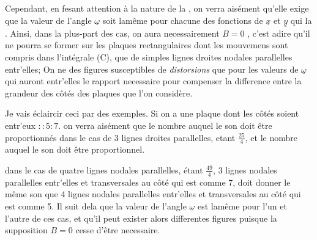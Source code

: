 \documentclass[11pt,a4paper]{article}
\begin{document}
Cependant, en fesant attention à la nature de la  ,
on verra aisément qu'elle exige que la valeur de l'angle $\underline{\omega}$
soit lamême pour chacune des fonctions de $\underline{x}$ et $\underline{y}$ qui la
 . Ainsi,  dans la plus-part des cas, on aura necessairement
$B=0$ , c'est adire qu'il ne pourra se former  sur les plaques rectangulaires dont les mouvemens sont
compris dans l'intégrale (C), que de simples lignes droites
nodales parallelles entr'elles;  On ne  
des  figures susceptibles de \emph{distorsions} que pour les
valeurs de  $\underline{\omega}$ qui  auront entr'elles le rapport
necessaire pour compenser la difference entre la grandeur
des côtés des plaques  que l'on considère.

Je vais éclaircir ceci par des exemples. Si on a une plaque
dont les côtés soient entr'eux $::5:7$. on verra aisément
que le nombre  auquel le son doit être proportionnés dans le cas
de 3 lignes droites parallelles, etant $\frac{25}{4}$, et 
le nombre auquel le  son doit être proportionnel.


dans le cas de quatre lignes nodales parallelles, étant $\frac{49}{4}$,
3 lignes nodales parallelles entr'elles et transversales au côté qui est
comme 7, doit donner le même son que 4 lignes nodales parallelles
entr'elles et transversales au côté qui est comme 5. Il suit dela
que la valeur de l'angle $\underline{\omega}$ est lamême pour l'un et
l'autre de ces cas, et qu'il peut exister alors differentes
figures  
puisque la supposition $B=0$ cesse d'être necessaire.
\end{document}
